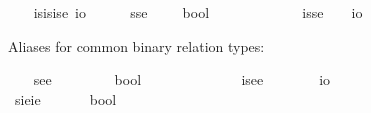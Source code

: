 \begin{isabellebody}
\ \ \isamarkupfalse%
\ isisise{\isacharequal}\ {\isachardoublequoteopen}{\isacharparenleft}{\isasymup}{\isasymlangle}{\isasymup}{\isasymlangle}{\isasymzero}{\isasymrangle}{\isasymrangle}{\isasymRightarrow}io{\isacharparenright}{\isachardoublequoteclose}\ \ {\isacharparenleft}{\isachardoublequoteopen}{\isasymup}{\isasymlangle}{\isasymup}{\isasymlangle}{\isasymup}{\isasymlangle}{\isasymzero}{\isasymrangle}{\isasymrangle}{\isasymrangle}{\isachardoublequoteclose}{\isacharparenright}\isanewline
\ \ \isamarkupfalse%
\ sse\ {\isacharequal}\ \ \ \ {\isachardoublequoteopen}{\isasymlangle}{\isasymzero}{\isasymrangle}{\isasymRightarrow}bool{\isachardoublequoteclose}\ \ \ \ \ \ \ \ \ {\isacharparenleft}{\isachardoublequoteopen}{\isasymlangle}{\isasymlangle}{\isasymzero}{\isasymrangle}{\isasymrangle}{\isachardoublequoteclose}{\isacharparenright}\isanewline
\ \ \isamarkupfalse%
\ isse\ {\isacharequal}\ \ \ {\isachardoublequoteopen}{\isasymlangle}{\isasymzero}{\isasymrangle}{\isasymRightarrow}io{\isachardoublequoteclose}\ \ \ \ \ \ \ \ \ \ {\isacharparenleft}{\isachardoublequoteopen}{\isasymup}{\isasymlangle}{\isasymlangle}{\isasymzero}{\isasymrangle}{\isasymrangle}{\isachardoublequoteclose}{\isacharparenright}%
\begin{isamarkuptext}%
Aliases for common binary relation types:%
\end{isamarkuptext}\isamarkuptrue%
\ \ \isamarkupfalse%
\ see\ {\isacharequal}\ \ \ \ \ \ \ \ {\isachardoublequoteopen}{\isacharparenleft}{\isasymzero}{\isasymRightarrow}{\isasymzero}{\isasymRightarrow}bool{\isacharparenright}{\isachardoublequoteclose}\ \ \ \ \ \ \ \ \ \ {\isacharparenleft}{\isachardoublequoteopen}{\isasymlangle}{\isasymzero}{\isacharcomma}{\isasymzero}{\isasymrangle}{\isachardoublequoteclose}{\isacharparenright}\isanewline
\ \ \isamarkupfalse%
\ isee\ {\isacharequal}\ \ \ \ \ \ \ {\isachardoublequoteopen}{\isacharparenleft}{\isasymzero}{\isasymRightarrow}{\isasymzero}{\isasymRightarrow}io{\isacharparenright}{\isachardoublequoteclose}\ \ \ \ \ \ \ \ \ \ \ {\isacharparenleft}{\isachardoublequoteopen}{\isasymup}{\isasymlangle}{\isasymzero}{\isacharcomma}{\isasymzero}{\isasymrangle}{\isachardoublequoteclose}{\isacharparenright}\isanewline
\ \ \isamarkupfalse%
\ sieie\ {\isacharequal}\ \ \ \ \ \ {\isachardoublequoteopen}{\isacharparenleft}{\isasymup}{\isasymzero}{\isasymRightarrow}{\isasymup}{\isasymzero}{\isasymRightarrow}bool{\isacharparenright}{\isachardoublequoteclose}\ \ \ \ \ \ \ {\isacharparenleft}{\isachardoublequoteopen}{\isasymlangle}{\isasymup}{\isasymzero}{\isacharcomma}{\isasymup}{\isasymzero}{\isasymrangle}{\isachardoublequoteclose}{\isacharparenright}\isanewline

\end{isabellebody}
